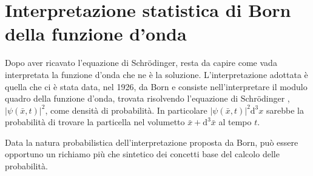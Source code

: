 


%

\chapter[Interpretazione statistica]{Interpretazione statistica di Born della funzione d'onda} %

\newcommand{\sch}{Schr\"odinger }
\newcommand{\scha}{Schr\"odinger}

Dopo aver ricavato l'equazione di \scha, resta da capire come vada interpretata la funzione d'onda che ne è la soluzione. L'interpretazione adottata è quella che ci è stata data, nel 1926, da Born e consiste nell'interpretare il modulo quadro della funzione d'onda, trovata risolvendo l'equazione di \sch,  $|\psi \left(\bar x,t\right)|^2$, come densità di probabilità. In particolare $|\psi \left(\bar x,t\right)|^2\textrm{d}^3x$ sarebbe la probabilità di trovare la particella nel volumetto $\bar x +\textrm{d}^3 \bar x$ al tempo $t$.
\newline

Data la natura probabilistica dell'interpretazione proposta da Born, può essere opportuno un richiamo più che sintetico dei concetti base del calcolo delle probabilità.

